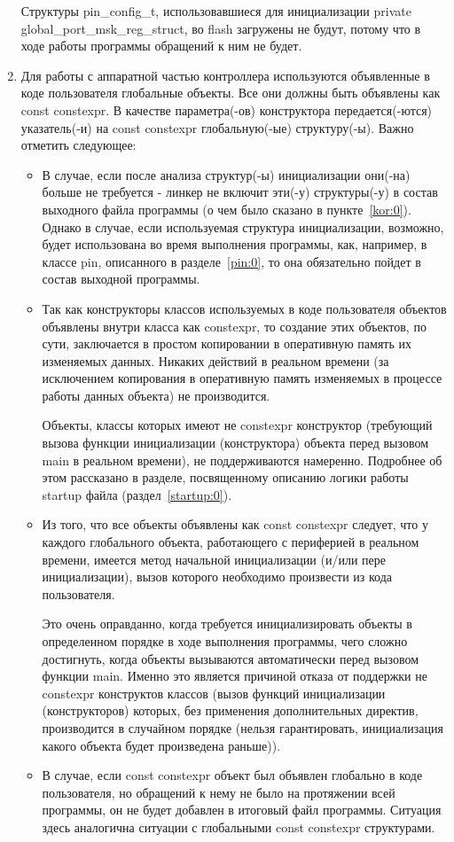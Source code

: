 \begin{enumerate}
	Структуры pin\_\-config\_\-t, использовавшиеся для инициализации private global\_\-port\_\-msk\_\-reg\_\-struct, во flash загружены не будут, потому что в ходе работы программы обращений к ним не будет.
	\label{kor:0}
	\item Для работы с аппаратной частью контроллера используются объявленные в коде пользователя глобальные объекты. Все они должны быть объявлены как const constexpr. В качестве параметра(-ов) конструктора передается(-ются) указатель(-и) на const constexpr глобальную(-ые) структуру(-ы). Важно отметить следующее:
	\begin{itemize}
		\item В случае, если после анализа структур(-ы) инициализации они(-на) больше не требуется - линкер не включит эти(-у) структуры(-у) в состав выходного файла программы (о чем было сказано в пункте~\ref{kor:0}). Однако в случае, если используемая структура инициализации, возможно, будет использована во время выполнения программы, как, например, в классе pin, описанного в разделе~\ref{pin:0}, то она обязательно пойдет в состав выходной программы.
		\item Так как конструкторы классов используемых в коде пользователя объектов объявлены внутри класса как constexpr, то создание этих объектов, по сути, заключается в простом копировании в оперативную память их изменяемых данных. Никаких действий в реальном времени (за исключением копирования в оперативную память изменяемых в процессе работы данных объекта) не производится.
		
		Объекты, классы которых имеют не constexpr конструктор (требующий вызова функции инициализации (конструктора) объекта перед вызовом main в реальном времени), не поддерживаются намеренно. Подробнее об этом рассказано в разделе, посвященному описанию логики работы startup файла (раздел~\ref{startup:0}).
		\item Из того, что все объекты объявлены как const constexpr следует, что у каждого глобального объекта, работающего с периферией в реальном времени, имеется метод начальной инициализации (и/или пере инициализации), вызов которого необходимо произвести из кода пользователя. 
		
		Это очень оправданно, когда требуется инициализировать объекты в определенном порядке в ходе выполнения программы, чего сложно достигнуть, когда объекты вызываются автоматически перед вызовом функции main. Именно это является причиной отказа от поддержки не constexpr конструктов классов (вызов функций инициализации (конструкторов) которых, без применения дополнительных директив, производится в случайном порядке (нельзя гарантировать, инициализация какого объекта будет произведена раньше)).
		
		\item В случае, если const constexpr объект был объявлен глобально в коде пользователя, но обращений к нему не было на протяжении всей программы, он не будет добавлен в итоговый файл программы. Ситуация здесь аналогична ситуации с глобальными const constexpr структурами.
	\end{itemize}
\end{enumerate}


\label{gp:0}				%
\label{pin:0}				%
\label{startup:0}			%